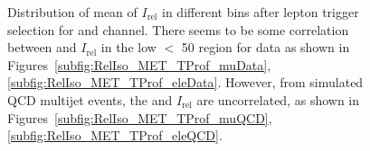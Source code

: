\begin{figure}
    \centering  
    \vfil
    \caption{Distribution of mean of $I_{\text{rel}}$ in different \MET bins after lepton trigger 
	selection for \mujets and \ejets channel. There seems to be some correlation between \MET 
	and $I_{\text{rel}}$ in the low 
	\MET $<$ 50 \GeV region for data as shown in Figures~\ref{subfig:RelIso_MET_TProf_muData},
	\ref{subfig:RelIso_MET_TProf_eleData}. However, from simulated QCD multijet events, 
	the \MET and $I_{\text{rel}}$ are uncorrelated, as shown in 
	Figures~\ref{subfig:RelIso_MET_TProf_muQCD}, \ref{subfig:RelIso_MET_TProf_eleQCD}.}
    \label{fig:qcdVar2}
\end{figure}


